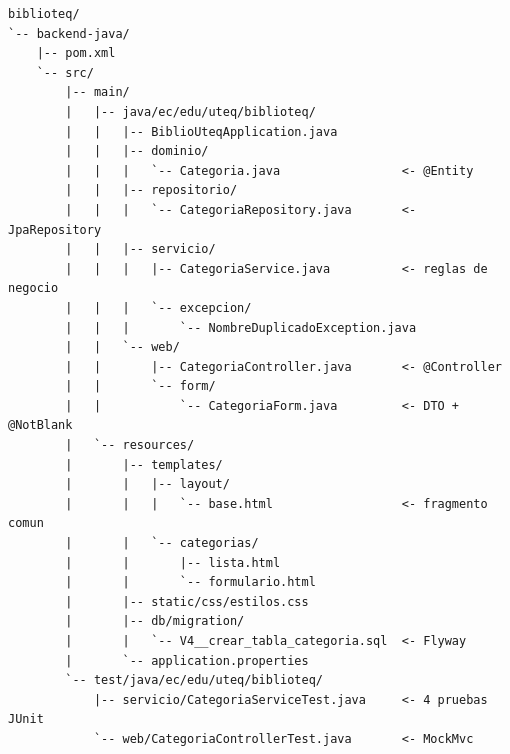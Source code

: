 \documentclass[11pt,a4paper,openany]{book}
\begin{document}
\begin{lstlisting}[style=plano,caption={Estructura de archivos del ejercicio 4.A dentro del monorepo del PFC.},label={lst:u4:arbol-4a}]
biblioteq/
`-- backend-java/
    |-- pom.xml
    `-- src/
        |-- main/
        |   |-- java/ec/edu/uteq/biblioteq/
        |   |   |-- BiblioUteqApplication.java
        |   |   |-- dominio/
        |   |   |   `-- Categoria.java                 <- @Entity
        |   |   |-- repositorio/
        |   |   |   `-- CategoriaRepository.java       <- JpaRepository
        |   |   |-- servicio/
        |   |   |   |-- CategoriaService.java          <- reglas de negocio
        |   |   |   `-- excepcion/
        |   |   |       `-- NombreDuplicadoException.java
        |   |   `-- web/
        |   |       |-- CategoriaController.java       <- @Controller
        |   |       `-- form/
        |   |           `-- CategoriaForm.java         <- DTO + @NotBlank
        |   `-- resources/
        |       |-- templates/
        |       |   |-- layout/
        |       |   |   `-- base.html                  <- fragmento comun
        |       |   `-- categorias/
        |       |       |-- lista.html
        |       |       `-- formulario.html
        |       |-- static/css/estilos.css
        |       |-- db/migration/
        |       |   `-- V4__crear_tabla_categoria.sql  <- Flyway
        |       `-- application.properties
        `-- test/java/ec/edu/uteq/biblioteq/
            |-- servicio/CategoriaServiceTest.java     <- 4 pruebas JUnit
            `-- web/CategoriaControllerTest.java       <- MockMvc
\end{lstlisting}
\end{document}
